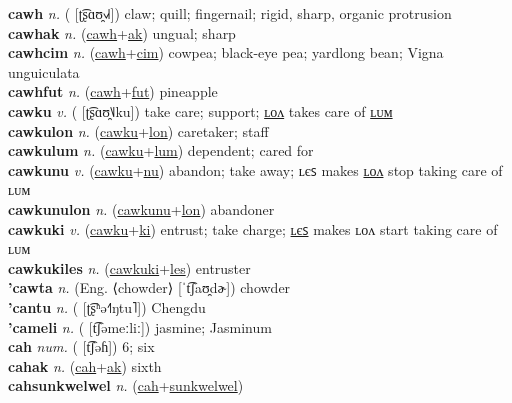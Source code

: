 \textbf{cawh} \textit{n.} ( [ʈ͡ʂɑʊ̯˧˩˧])
claw; quill; fingernail; rigid, sharp, organic protrusion \label{cawh} \\
\textbf{cawhak} \textit{n.} (\hyperref[cawh]{cawh}+\hyperref[ak]{ak})
ungual; sharp \label{cawhak} \\
\textbf{cawhcim} \textit{n.} (\hyperref[cawh]{cawh}+\hyperref[cim]{cim})
cowpea; black-eye pea; yardlong bean; Vigna unguiculata \label{cawhcim} \\
\textbf{cawhfut} \textit{n.} (\hyperref[cawh]{cawh}+\hyperref[fut]{fut})
pineapple \label{cawhfut} \\
\textbf{cawku} \textit{v.} ( [ʈ͡ʂɑʊ̯˥˩ku])
take care; support; \hyperref[cawkulon]{ʟᴏᴧ} takes care of \hyperref[cawkulum]{ʟᴜᴍ} \label{cawku} \\
\textbf{cawkulon} \textit{n.} (\hyperref[cawku]{cawku}+\hyperref[lon]{lon})
caretaker; staff \label{cawkulon} \\
\textbf{cawkulum} \textit{n.} (\hyperref[cawku]{cawku}+\hyperref[lum]{lum})
dependent; cared for \label{cawkulum} \\
\textbf{cawkunu} \textit{v.} (\hyperref[cawku]{cawku}+\hyperref[nu]{nu})
abandon; take away; ʟєꜱ makes \hyperref[cawkunulon]{ʟᴏᴧ} stop taking care of ʟᴜᴍ \label{cawkunu} \\
\textbf{cawkunulon} \textit{n.} (\hyperref[cawkunu]{cawkunu}+\hyperref[lon]{lon})
abandoner \label{cawkunulon} \\
\textbf{cawkuki} \textit{v.} (\hyperref[cawku]{cawku}+\hyperref[ki]{ki})
entrust; take charge; \hyperref[cawkukiles]{ʟєꜱ} makes ʟᴏᴧ start taking care of ʟᴜᴍ \label{cawkuki} \\
\textbf{cawkukiles} \textit{n.} (\hyperref[cawkuki]{cawkuki}+\hyperref[les]{les})
entruster \label{cawkukiles} \\
\textbf{'cawta} \textit{n.} (Eng. ⟨chowder⟩ [ˈt͡ʃaʊ̯dɚ])
chowder \label{'cawta} \\
\textbf{'cantu} \textit{n.} ( [ʈ͡ʂʰə˧˥ŋtu˥])
Chengdu \label{'cantu} \\
\textbf{'cameli} \textit{n.} ( [t͡ʃəmeːliː])
jasmine; Jasminum \label{'cameli} \\
\textbf{cah} \textit{num.} ( [t͡ʃəɦ])
6; six \label{cah} \\
\textbf{cahak} \textit{n.} (\hyperref[cah]{cah}+\hyperref[ak]{ak})
sixth \label{cahak} \\
\textbf{cahsunkwelwel} \textit{n.} (\hyperref[cah]{cah}+\hyperref[sunkwelwel]{sunkwelwel})
